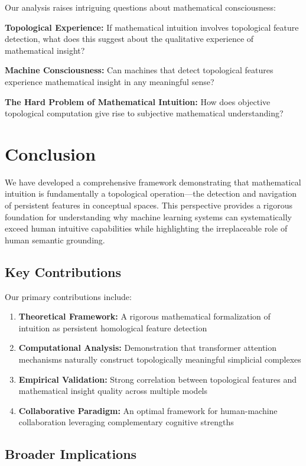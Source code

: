 \documentclass[11pt]{article}
\begin{document}
Our analysis raises intriguing questions about mathematical consciousness:

\textbf{Topological Experience:} If mathematical intuition involves topological feature detection, what does this suggest about the qualitative experience of mathematical insight?

\textbf{Machine Consciousness:} Can machines that detect topological features experience mathematical insight in any meaningful sense?

\textbf{The Hard Problem of Mathematical Intuition:} How does objective topological computation give rise to subjective mathematical understanding?

\section{Conclusion}

We have developed a comprehensive framework demonstrating that mathematical intuition is fundamentally a topological operation—the detection and navigation of persistent features in conceptual spaces. This perspective provides a rigorous foundation for understanding why machine learning systems can systematically exceed human intuitive capabilities while highlighting the irreplaceable role of human semantic grounding.

\subsection{Key Contributions}

Our primary contributions include:

\begin{enumerate}
\item \textbf{Theoretical Framework:} A rigorous mathematical formalization of intuition as persistent homological feature detection
\item \textbf{Computational Analysis:} Demonstration that transformer attention mechanisms naturally construct topologically meaningful simplicial complexes
\item \textbf{Empirical Validation:} Strong correlation between topological features and mathematical insight quality across multiple models
\item \textbf{Collaborative Paradigm:} An optimal framework for human-machine collaboration leveraging complementary cognitive strengths
\end{enumerate}

\subsection{Broader Implications}
\end{document}
